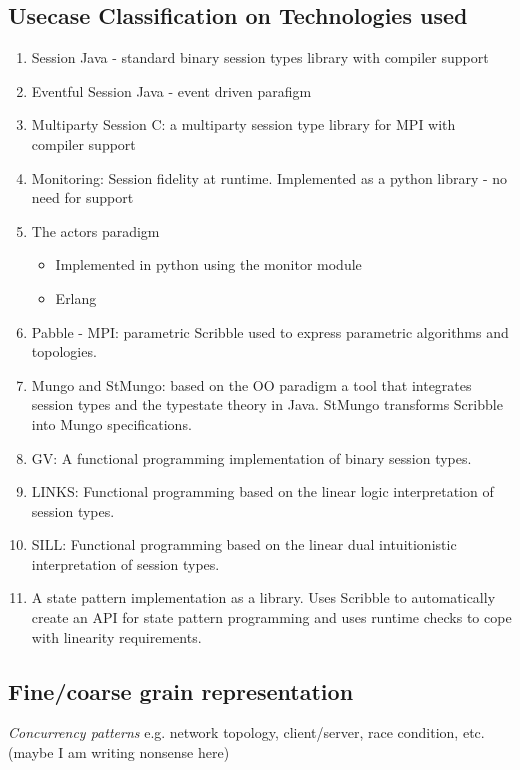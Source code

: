 \subsection{Usecase Classification on Technologies used}


\begin{enumerate}
	\item	Session Java - standard binary session types library with compiler support
	\item	Eventful Session Java - event driven parafigm
	\item	Multiparty Session C: a multiparty session type library for MPI  with compiler support
	\item	Monitoring: Session fidelity at runtime. Implemented as a python library - no need for support
	\item	The actors paradigm
			\begin{itemize}
				\item	Implemented in python using the monitor module
				\item	Erlang
			\end{itemize}
	\item	Pabble - MPI: parametric Scribble used to express parametric algorithms and topologies.
	\item	Mungo and StMungo:	based on the OO paradigm a tool that integrates session types and the 
								typestate theory in Java. StMungo transforms Scribble into Mungo
								specifications.
	\item	GV:			A functional programming implementation of binary session types.
	\item	LINKS:		Functional programming based on the linear logic interpretation of session types.
	\item	SILL:		Functional programming based on the linear dual intuitionistic interpretation of session types.

	\item	A state pattern implementation as a library. Uses Scribble to automatically
			create an API for state pattern programming and uses runtime checks to
			cope with linearity requirements.

\end{enumerate}

\subsection{Fine/coarse grain representation}

{\em Concurrency patterns} e.g. network topology, client/server, race condition, etc. (maybe I am writing nonsense here)

